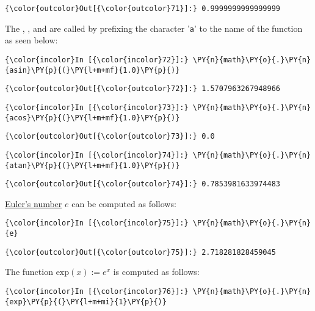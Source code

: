 \begin{Verbatim}[commandchars=\\\{\}]
{\color{outcolor}Out[{\color{outcolor}71}]:} 0.9999999999999999
\end{Verbatim}
The , , and  are called by prefixing the
character '\texttt{a}' to the name of the function as seen below:
\begin{Verbatim}[commandchars=\\\{\}]
{\color{incolor}In [{\color{incolor}72}]:} \PY{n}{math}\PY{o}{.}\PY{n}{asin}\PY{p}{(}\PY{l+m+mf}{1.0}\PY{p}{)}
\end{Verbatim}

\begin{Verbatim}[commandchars=\\\{\}]
{\color{outcolor}Out[{\color{outcolor}72}]:} 1.5707963267948966
\end{Verbatim}
            
\begin{Verbatim}[commandchars=\\\{\}]
{\color{incolor}In [{\color{incolor}73}]:} \PY{n}{math}\PY{o}{.}\PY{n}{acos}\PY{p}{(}\PY{l+m+mf}{1.0}\PY{p}{)}
\end{Verbatim}

\begin{Verbatim}[commandchars=\\\{\}]
{\color{outcolor}Out[{\color{outcolor}73}]:} 0.0
\end{Verbatim}
            
\begin{Verbatim}[commandchars=\\\{\}]
{\color{incolor}In [{\color{incolor}74}]:} \PY{n}{math}\PY{o}{.}\PY{n}{atan}\PY{p}{(}\PY{l+m+mf}{1.0}\PY{p}{)}
\end{Verbatim}

\begin{Verbatim}[commandchars=\\\{\}]
{\color{outcolor}Out[{\color{outcolor}74}]:} 0.7853981633974483
\end{Verbatim} 
\href{https://en.wikipedia.org/wiki/E_(mathematical_constant)}{Euler's number} \(e\) can be computed as follows:
\begin{Verbatim}[commandchars=\\\{\}]
{\color{incolor}In [{\color{incolor}75}]:} \PY{n}{math}\PY{o}{.}\PY{n}{e}
\end{Verbatim}

\begin{Verbatim}[commandchars=\\\{\}]
{\color{outcolor}Out[{\color{outcolor}75}]:} 2.718281828459045
\end{Verbatim}
The  function \(\mathrm{exp}(x) := e^x\) is computed as follows:
\begin{Verbatim}[commandchars=\\\{\}]
{\color{incolor}In [{\color{incolor}76}]:} \PY{n}{math}\PY{o}{.}\PY{n}{exp}\PY{p}{(}\PY{l+m+mi}{1}\PY{p}{)}
\end{Verbatim}

